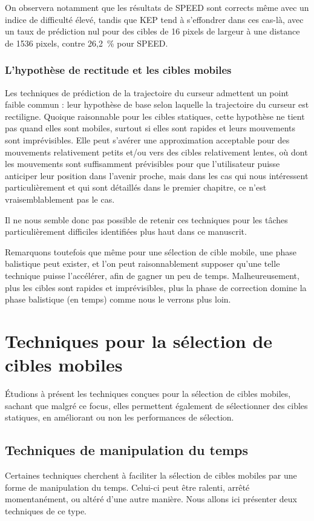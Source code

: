 	On observera notamment que les résultats de SPEED sont corrects même avec un indice de difficulté élevé, tandis que KEP tend à s'effondrer dans ces cas-là, avec un taux de prédiction nul pour des cibles de 16 pixels de largeur à une distance de 1536 pixels, contre 26,2~\%{} pour SPEED.
	
	\subsubsection{L'hypothèse de rectitude et les cibles mobiles}
	Les techniques de prédiction de la trajectoire du curseur admettent un point faible commun : leur hypothèse de base selon laquelle la trajectoire du curseur est rectiligne. Quoique raisonnable pour les cibles statiques, cette hypothèse ne tient pas quand elles sont mobiles, surtout si elles sont rapides et leurs mouvements sont imprévisibles. Elle peut s'avérer une approximation acceptable pour des mouvements relativement petits et/ou vers des cibles relativement lentes, où dont les mouvements sont suffisamment prévisibles pour que l'utilisateur puisse anticiper leur position dans l'avenir proche, mais dans les cas qui nous intéressent particulièrement et qui sont détaillés dans le premier chapitre, ce n'est vraisemblablement pas le cas.
	
	Il ne nous semble donc pas possible de retenir ces techniques pour les tâches particulièrement difficiles identifiées plus haut dans ce manuscrit.
	
	Remarquons toutefois que même pour une sélection de cible mobile, une phase balistique peut exister, et l'on peut raisonnablement supposer qu'une telle technique puisse l'accélérer, afin de gagner un peu de temps. Malheureusement, plus les cibles sont rapides et imprévisibles, plus la phase de correction domine la phase balistique (en temps) comme nous le verrons plus loin.

\section{Techniques pour la sélection de cibles mobiles}
	Étudions à présent les techniques conçues pour la sélection de cibles mobiles, sachant que malgré ce focus, elles permettent également de sélectionner des cibles statiques, en améliorant ou non les performances de sélection.
	
	\subsection{Techniques de manipulation du temps}
	Certaines techniques cherchent à faciliter la sélection de cibles mobiles par une forme de manipulation du temps. Celui-ci peut être ralenti, arrêté momentanément, ou altéré d'une autre manière. Nous allons ici présenter deux techniques de ce type.
	
